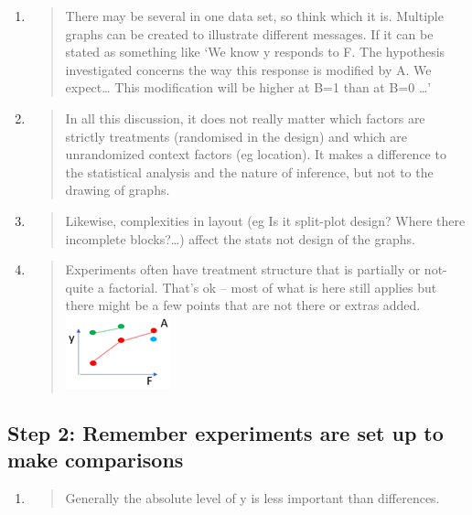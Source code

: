 \documentclass[
]{book}
\begin{document}
\begin{enumerate}
\def\labelenumi{\alph{enumi}.}
\item
  \begin{quote}
  There may be several in one data set, so think which it is. Multiple graphs can be created to illustrate different messages. If it can be stated as something like `We know y responds to F. The hypothesis investigated concerns the way this response is modified by A. We expect\ldots{} This modification will be higher at B=1 than at B=0 \ldots{}'
  \end{quote}
\item
  \begin{quote}
  In all this discussion, it does not really matter which factors are strictly treatments (randomised in the design) and which are unrandomized context factors (eg location). It makes a difference to the statistical analysis and the nature of inference, but not to the drawing of graphs.
  \end{quote}
\item
  \begin{quote}
  Likewise, complexities in layout (eg Is it split-plot design? Where there incomplete blocks?\ldots) affect the stats not design of the graphs.
  \end{quote}
\item
  \begin{quote}
  Experiments often have treatment structure that is partially or not-quite a factorial. That's ok -- most of what is here still applies but there might be a few points that are not there or extras added.
  \includegraphics{img/Picture5.png}
  \end{quote}
\end{enumerate}

\hypertarget{step-2-remember-experiments-are-set-up-to-make-comparisons}{%
\subsection{Step 2: Remember experiments are set up to make comparisons}\label{step-2-remember-experiments-are-set-up-to-make-comparisons}}

\begin{enumerate}
\def\labelenumi{\alph{enumi}.}
\item
  \begin{quote}
  Generally the absolute level of y is less important than differences.
  \end{quote}
\end{enumerate}
\end{document}
